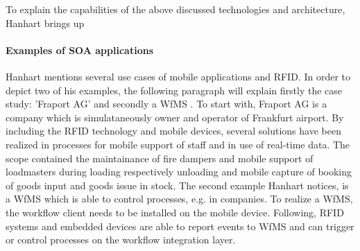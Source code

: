 To explain the capabilities of the above discussed technologies and architecture, Hanhart brings up  

\paragraph{Examples of SOA applications}

Hanhart mentions several use cases of mobile applications and RFID. In order to depict two of his examples, the following paragraph will explain firstly the case study: 'Fraport AG' \cite[p.39 ff.]{mobile} and secondly a \ac{WfMS} \cite[p.204 ff.]{mobile}. To start with, Fraport AG is a company which is simulataneously owner and operator of Frankfurt airport. By including the RFID technology and mobile devices, several solutions have been realized in processes for mobile support of staff and in use of real-time data. The scope contained the maintainance of fire dampers and mobile support of loadmasters during loading respectively unloading and mobile capture of booking of goods input and goods issue in stock. 
The second example Hanhart notices, is a WfMS \cite[p.204 ff.]{mobile} which is able to control processes, e.g. in companies. To realize a WfMS, the workflow client needs to be installed on the mobile device. Following, RFID systems and embedded devices are able to report events to WfMS and can trigger or control processes on the workflow integration layer.
     





















